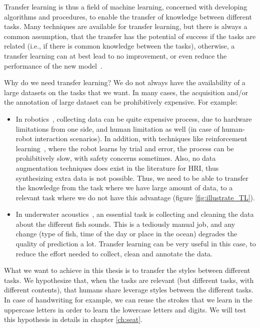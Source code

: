\par Transfer learning is thus a field of machine learning, concerned with developing algorithms and procedures, to enable the transfer of knowledge between different tasks. Many techniques are available for transfer learning, but there is always a common assumption, that the transfer has the potential of success if the tasks are related (i.e., if there is common knowledge between the tasks), otherwise, a transfer learning can at best lead to no improvement, or even reduce the performance of the new model~\citep{weiss2016survey}.

\par Why do we need transfer learning? We do not always have the availability of a large datasets on the tasks that we want. In many cases, the acquisition and/or the annotation of large dataset can be prohibitively expensive. For example:
\begin{itemize}
  \item In robotics~\citep{konidaris2012robot,Konidaris:2012:TRL:2188385.2343689}, collecting data can be quite expensive process, due to hardware limitations from one side, and human limitation as well (in case of human-robot interaction scenarios). In addition, with techniques like reinforcement learning~\citep{sutton2018reinforcement}, where the robot learns by trial and error, the process can be prohibitively slow, with safety concerns sometimes. Also, no data augmentation techniques does exist in the literature for HRI, thus synthesizing extra data is not possible. Thus, we need to be able to transfer the knowledge from the task where we have large amount of data, to a relevant task where we do not have this advantage (figure \ref{fig:illustrate_TL}).
  \item In underwater acoustics~\citep{malfante2018automatic}, an essential task is collecting and cleaning the data about the different fish sounds. This is a tediously manual job, and any change (type of fish, time of the day or place in the ocean) degrades the quality of prediction a lot. Transfer learning can be very useful in this case, to reduce the effort needed to collect, clean and annotate the data.
\end{itemize}

\par What we want to achieve in this thesis is to transfer the styles between different tasks. We hypothesize that, when the tasks are relevant (but different tasks, with different contents), that humans share leverage styles between the different tasks. In case of handwriting for example, we can reuse the strokes that we learn in the uppercase letters in order to learn the lowercase letters and digits. We will test this hypothesis in details in chapter \ref{ch:seat}.

